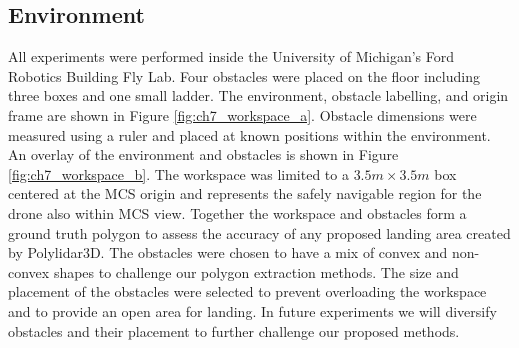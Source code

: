 \subsection{Environment}

All experiments were performed inside the University of Michigan's Ford Robotics Building Fly Lab. Four obstacles were placed on the floor including three boxes and one small ladder. The environment, obstacle labelling, and origin frame are shown in Figure \ref{fig:ch7_workspace_a}. Obstacle dimensions were measured using a ruler and placed at known positions within the environment. An overlay of the environment and obstacles is shown in Figure \ref{fig:ch7_workspace_b}. The workspace was limited to a $3.5m\times3.5m$ box centered at the \ac{MCS} origin and represents the safely navigable region for the drone also within \ac{MCS} view. Together the workspace and obstacles form a ground truth polygon to assess the accuracy of any proposed landing area created by Polylidar3D. The obstacles were chosen to have a mix of convex and non-convex shapes to challenge our polygon extraction methods. The size and placement of the obstacles were selected to prevent overloading the workspace and to provide an open area for landing. In future experiments we will diversify obstacles and their placement to further challenge our proposed methods.

